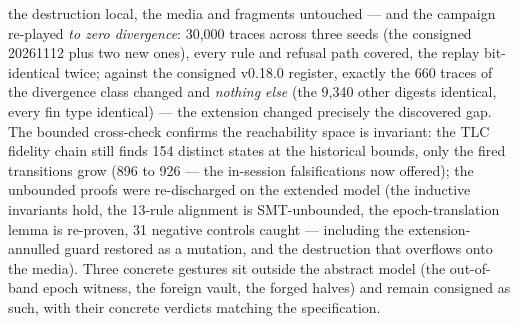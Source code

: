 \documentclass[10pt,a4paper]{article}
\begin{document}
the destruction local, the media and fragments untouched --- and the
campaign re-played \emph{to zero divergence}: 30{,}000 traces across
three seeds (the consigned 20261112 plus two new ones), every rule and
refusal path covered, the replay bit-identical twice; against the
consigned v0.18.0 register, exactly the 660 traces of the divergence
class changed and \emph{nothing else} (the 9{,}340 other digests
identical, every fin type identical) --- the extension changed
precisely the discovered gap. The bounded cross-check confirms the
reachability space is invariant: the TLC fidelity chain still finds
154 distinct states at the historical bounds, only the fired
transitions grow (896 to 926 --- the in-session falsifications now
offered); the unbounded proofs were re-discharged on the extended
model (the inductive invariants hold, the 13-rule alignment is
SMT-unbounded, the epoch-translation lemma is re-proven, 31 negative
controls caught --- including the extension-annulled guard restored
as a mutation, and the destruction that overflows onto the media). Three concrete gestures sit outside the abstract model
(the out-of-band epoch witness, the foreign vault, the forged halves)
and remain consigned as such, with their concrete verdicts matching
the specification.
\end{document}
